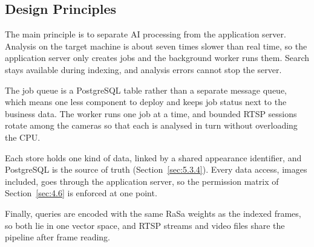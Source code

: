 \subsection{Design Principles}
\label{sec:5.1.3}

The main principle is to separate AI processing from the application server. Analysis on the target machine is about seven times slower than real time, so the application server only creates jobs and the background worker runs them. Search stays available during indexing, and analysis errors cannot stop the server.

The job queue is a PostgreSQL table rather than a separate message queue, which means one less component to deploy and keeps job status next to the business data. The worker runs one job at a time, and bounded RTSP sessions rotate among the cameras so that each is analysed in turn without overloading the CPU.

Each store holds one kind of data, linked by a shared appearance identifier, and PostgreSQL is the source of truth (Section~\ref{sec:5.3.4}). Every data access, images included, goes through the application server, so the permission matrix of Section~\ref{sec:4.6} is enforced at one point.

Finally, queries are encoded with the same RaSa weights as the indexed frames, so both lie in one vector space, and RTSP streams and video files share the pipeline after frame reading.
